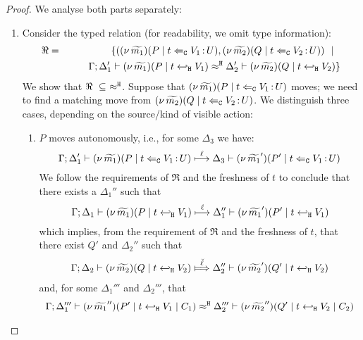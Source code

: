 \begin{proof}
We analyse both parts separately:
	\begin{enumerate}[1.]
		\item  Consider the typed relation (for readability, we omit type information):
				\begin{eqnarray*}
					\Re	&=&		\{	((\nu\, \widetilde{m_1})(P \;|\; t \Leftarrow_{\mathtt{C}} V_1{\,:\,}U ),
										(\nu\, \widetilde{m_2})(Q \;|\; t \Leftarrow_{\mathtt{C}} V_2{\,:\,}U))
								\ \ |\ \ \\
						&&		\qquad	\Gamma; \Delta_1' \vdash (\nu\, \widetilde{m_1})(P \;|\; t \hookleftarrow_{\mathtt{H}} V_1) \approx^\mathtt{H} \Delta_2' \vdash (\nu\, \widetilde{m_2})(Q \;|\; t \hookleftarrow_{\mathtt{H}} V_2) \}
				\end{eqnarray*}
				We show that $\Re\ \subseteq\ \hwb$.
				Suppose that $(\nu\, \widetilde{m_1})(P \;|\; t \Leftarrow_{\mathtt{C}} V_1{\,:\,}U )$ moves; we need
				to find a matching move from $(\nu\, \widetilde{m_2})(Q \;|\; t \Leftarrow_{\mathtt{C}} V_2{\,:\,}U )$.
				We distinguish three cases, depending on the source/kind of visible action: 
				\begin{enumerate}
					\item	$P$ moves autonomously, i.e., for some $\Delta_3$ we have:
						\[
							\Gamma; \Delta_1' \vdash (\nu\, \widetilde{m_1})(P \;|\; t \Leftarrow_{\mathtt{C}} V_1{\,:\,}U ) \stackrel{\ell}{\longmapsto} \Delta_3 \vdash{(\nu\, \widetilde{m_1}')(P' \;|\;t \Leftarrow_{\mathtt{C}} V_1{\,:\,}U )}
						\]
							We follow the requirements of $\Re$ and the freshness of $t$
							to conclude that there exists a $\Delta_1''$ such that
						\[
							\Gamma; \Delta_1 \vdash (\nu\, \widetilde{m_1})(P \;|\; t \hookleftarrow_{\mathtt{H}} V_1) \stackrel{\ell}{\longmapsto} \Delta_1'' \vdash (\nu\, \widetilde{m_1}')(P' \;|\; t \hookleftarrow_{\mathtt{H}} V_1)
						\]
							which implies, from the  requirement of $\Re$ and
							the freshness of $t$, that there exist $Q'$ and $\Delta_2''$ such that
						\begin{eqnarray}
							\horel{\Gamma}{\Delta_2}{\newsp{\widetilde{m_2}}{Q \Par \htrigger{t}{V_2}}}
							{\Hby{\mact{\ell}}}
							{\Delta_2''}{\newsp{\widetilde{m_2}'}{Q' \Par \htrigger{t}{V_2}}}
							\label{proof:trig_equiv00}
						\end{eqnarray}
							and, for some $\Delta_1'''$ and $\Delta_2'''$, that
						\begin{eqnarray}
							\horel{\Gamma}{\Delta_1'''}{\newsp{\widetilde{m_1}''}{P' \Par \htrigger{t}{V_1} \Par C_1}}
							{\hwb}
							{\Delta_2'''}{\newsp{\widetilde{m_2}''}{Q' \Par \htrigger{t}{V_2} \Par C_2}}

\end{eqnarray}
\end{enumerate}
\end{enumerate}
\end{proof}
